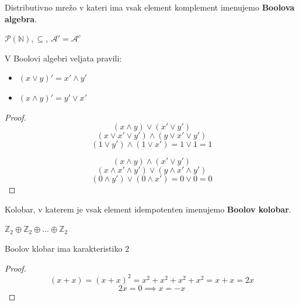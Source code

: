 \documentclass[slovene]{beamer}
\begin{document}
\begin{frame}
\begin{definition}
Distributivno mrežo v kateri ima vsak element komplement imenujemo \textbf{Boolova algebra}.
\end{definition}
\begin{example}
$\mathcal{P}(\mathbb{N}), \subseteq$, $\mathcal{A}' = \mathcal{A}^c$ 
\end{example}
\end{frame}

\begin{frame}
\begin{theorem}
V Boolovi algebri veljata pravili:
\begin{itemize}
\item $(x \lor y)' = x' \land y'$
\item $(x \land y)' = y' \lor x'$ 
\end{itemize}
\end{theorem}
\end{frame}

\begin{frame}
\begin{proof}
$$(x \land y) \lor (x' \lor y')$$  $$(x \lor x' \lor y') \land (y \lor x' \lor y')$$  $$(1 \lor y') \land (1 \lor x') = 1 \lor 1 = 1$$

$$(x \land y) \land (x' \lor y')$$  $$(x \land x' \land y') \lor (y \land x' \land y')$$  $$(0 \land y') \lor (0 \land x') = 0 \lor 0 = 0$$

\end{proof}

\end{frame}


\begin{frame}%
\begin{definition}
Kolobar, v katerem je vsak element idempotenten imenujemo \textbf{Boolov kolobar}.
\end{definition}
\begin{example}
$\mathbb{Z}_2 \oplus \mathbb{Z}_2 \oplus \dots \oplus \mathbb{Z}_2$
\end{example}
\end{frame}


\begin{frame}
\begin{theorem}
Boolov klobar ima karakteristiko $2$
\end{theorem}
\pause
\begin{proof}
$$(x + x) = (x + x)^2 = x^2 + x^2 + x^2 + x^2 = x + x = 2x$$ 
$$2x = 0 \implies x = -x$$
\end{proof}
\end{frame}
\end{document}
